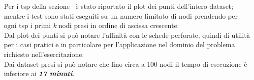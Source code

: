 \documentclass{article}
\begin{document}
Per i tsp della sezione~ è stato riportato il plot dei punti dell'intero dataset; mentre i test sono stati eseguiti su un numero limitato di nodi prendendo per ogni tsp i primi \textit{k} nodi presi in ordine di ascissa crescente.\\
Dal plot dei punti si può notare l'affinità con le schede perforate, quindi di utilità per i casi pratici e in particolare per l'applicazione nel dominio del problema richiesto nell'esercitazione.\\
Dai dataset presi si può notare che fino circa a 100 nodi il tempo di esecuzione è inferiore ai \textbf{\textit{17 minuti}}.


%

%

\end{document}
